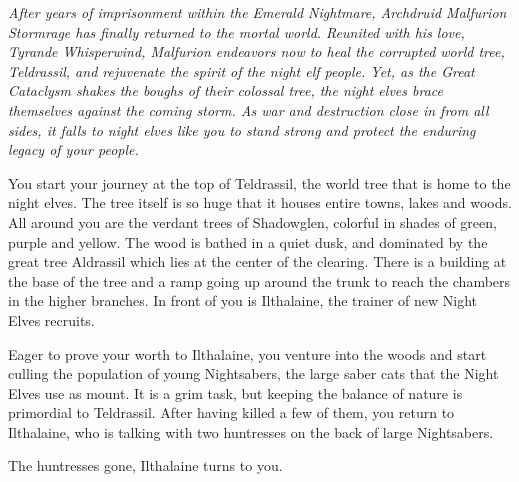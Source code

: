 \textit{After years of imprisonment within the Emerald Nightmare, Archdruid Malfurion Stormrage has finally returned to the mortal world. Reunited with his love, Tyrande Whisperwind, Malfurion endeavors now to heal the corrupted world tree, Teldrassil, and rejuvenate the spirit of the night elf people. Yet, as the Great Cataclysm shakes the boughs of their colossal tree, the night elves brace themselves against the coming storm. As war and destruction close in from all sides, it falls to night elves like you to stand strong and protect the enduring legacy of your people.}

You start your journey at the top of Teldrassil, the world tree that is home to the night elves. The tree itself is so huge that it houses entire towns, lakes and woods. All around you are the verdant trees of Shadowglen, colorful in shades of green, purple and yellow. The wood is bathed in a quiet dusk, and dominated by the great tree Aldrassil which lies at the center of the clearing. There is a building at the base of the tree and a ramp going up around the trunk to reach the chambers in the higher branches. In front of you is Ilthalaine, the trainer of new Night Elves recruits.



Eager to prove your worth to Ilthalaine, you venture into the woods and start culling the population of young Nightsabers, the large saber cats that the Night Elves use as mount. It is a grim task, but keeping the balance of nature is primordial to Teldrassil. After having killed a few of them, you return to Ilthalaine, who is talking with two huntresses on the back of large Nightsabers.


The huntresses gone, Ilthalaine turns to you.


 


